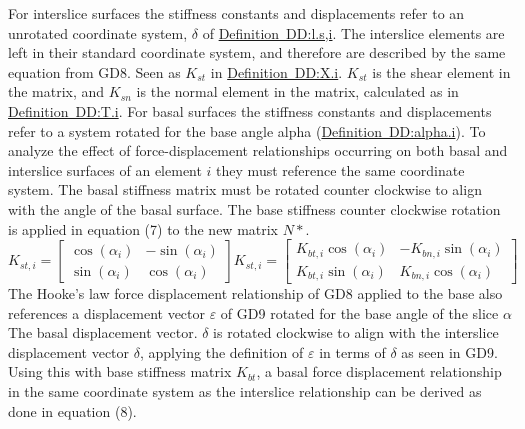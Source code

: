 \documentclass[12pt]{article}
\begin{document}
For interslice surfaces the stiffness constants and displacements refer to an unrotated coordinate system, $δ$ of \hyperref[DD:l.s,i]{Definition~DD:l.s,i}. The interslice elements are left in their standard coordinate system, and therefore are described by the same equation from GD8. Seen as ${K_{st}}$ in \hyperref[DD:X.i]{Definition~DD:X.i}. ${K_{st}}$ is the shear element in the matrix, and ${K_{sn}}$ is the normal element in the matrix, calculated as in \hyperref[DD:T.i]{Definition~DD:T.i}.
For basal surfaces the stiffness constants and displacements refer to a system rotated for the base angle alpha (\hyperref[DD:alpha.i]{Definition~DD:alpha.i}). To analyze the effect of force-displacement relationships occurring on both basal and interslice surfaces of an element $i$ they must reference the same coordinate system. The basal stiffness matrix must be rotated counter clockwise to align with the angle of the basal surface. The base stiffness counter clockwise rotation is applied in equation (7) to the new matrix $N*$.
\begin{dmath}
{K_{st,i}}=\begin{bmatrix}
\cos\left(α_{i}\right) & -\sin\left(α_{i}\right)\\
\sin\left(α_{i}\right) & \cos\left(α_{i}\right)
\end{bmatrix} {K_{st,i}}=\begin{bmatrix}
{K_{bt,i}} \cos\left(α_{i}\right) & -{K_{bn,i}} \sin\left(α_{i}\right)\\
{K_{bt,i}} \sin\left(α_{i}\right) & {K_{bn,i}} \cos\left(α_{i}\right)
\end{bmatrix}
\end{dmath}
The Hooke's law force displacement relationship of GD8 applied to the base also references a displacement vector $ε$ of GD9 rotated for the base angle of the slice $α$ The basal displacement vector. $δ$ is rotated clockwise to align with the interslice displacement vector $δ$, applying the definition of $ε$ in terms of $δ$ as seen in GD9. Using this with base stiffness matrix ${K_{bt}}$, a basal force displacement relationship in the same coordinate system as the interslice relationship can be derived as done in equation (8).
\end{document}
